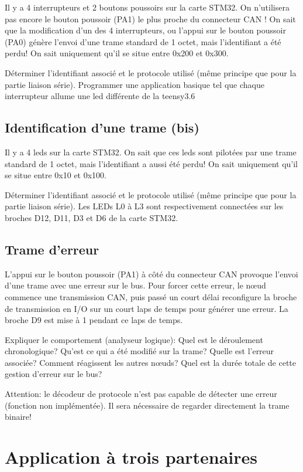 \documentclass[11pt]{paper}
\begin{document}
Il y a 4 interrupteurs et 2 boutons poussoirs sur la carte STM32. On n’utilisera pas encore le bouton poussoir (PA1) le plus proche du connecteur CAN ! On sait que la modification d’un des 4 interrupteurs, ou l’appui sur le bouton poussoir (PA0) génère l’envoi d’une trame standard de 1 octet, mais l’identifiant a été perdu! On sait uniquement qu’il se situe entre 0x200 et 0x300.

Déterminer l’identifiant associé et le protocole utilisé (même principe que pour la partie liaison série). Programmer une application basique tel que chaque interrupteur allume une led différente de la teensy3.6

\subsection{Identification d'une trame (bis)}

Il y a 4 leds sur la carte STM32. On sait que ces leds sont pilotées par une trame standard de 1 octet, mais l’identifiant a aussi été perdu! On sait uniquement qu’il se situe entre 0x10 et 0x100.

Déterminer l’identifiant associé et le protocole utilisé (même principe que pour la partie liaison série). Les LEDs L0 à L3 sont respectivement connectées sur les broches D12, D11, D3 et D6 de la carte STM32.

\subsection{Trame d'erreur}

L’appui sur le bouton poussoir (PA1) à côté du connecteur CAN provoque l’envoi d’une trame avec une erreur sur le bus. Pour forcer cette erreur, le nœud commence une transmission CAN, puis passé un court délai reconfigure la broche de transmission en I/O sur un court laps de temps pour générer une erreur. La broche D9 est mise à 1 pendant ce laps de temps.

Expliquer le comportement (analyseur logique): Quel est le déroulement chronologique? Qu’est ce qui a été modifié sur la trame? Quelle est l’erreur associée? Comment réagissent les autres nœuds? Quel est la durée totale de cette gestion d’erreur sur le bus?

Attention: le décodeur de protocole n’est pas capable de détecter une erreur (fonction non implémentée). Il sera nécessaire de regarder directement la trame binaire!

\section{Application à trois partenaires}
\end{document}
